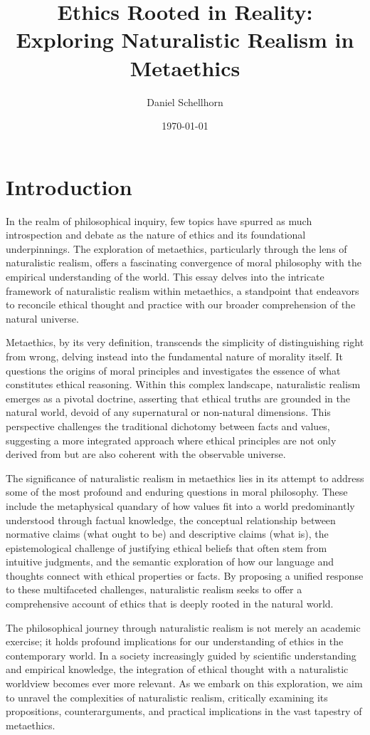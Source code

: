 \documentclass[12pt,a4paper]{article}
\title{Ethics Rooted in Reality: Exploring Naturalistic Realism in Metaethics}
\author{Daniel Schellhorn}
\date{\today}
\begin{document}
\maketitle

\section{Introduction}
In the realm of philosophical inquiry, few topics have spurred as much introspection and debate as the nature of ethics and its foundational underpinnings. The exploration of metaethics, particularly through the lens of naturalistic realism, offers a fascinating convergence of moral philosophy with the empirical understanding of the world. This essay delves into the intricate framework of naturalistic realism within metaethics, a standpoint that endeavors to reconcile ethical thought and practice with our broader comprehension of the natural universe.

Metaethics, by its very definition, transcends the simplicity of distinguishing right from wrong, delving instead into the fundamental nature of morality itself. It questions the origins of moral principles and investigates the essence of what constitutes ethical reasoning. Within this complex landscape, naturalistic realism emerges as a pivotal doctrine, asserting that ethical truths are grounded in the natural world, devoid of any supernatural or non-natural dimensions. This perspective challenges the traditional dichotomy between facts and values, suggesting a more integrated approach where ethical principles are not only derived from but are also coherent with the observable universe.

The significance of naturalistic realism in metaethics lies in its attempt to address some of the most profound and enduring questions in moral philosophy. These include the metaphysical quandary of how values fit into a world predominantly understood through factual knowledge, the conceptual relationship between normative claims (what ought to be) and descriptive claims (what is), the epistemological challenge of justifying ethical beliefs that often stem from intuitive judgments, and the semantic exploration of how our language and thoughts connect with ethical properties or facts. By proposing a unified response to these multifaceted challenges, naturalistic realism seeks to offer a comprehensive account of ethics that is deeply rooted in the natural world.

The philosophical journey through naturalistic realism is not merely an academic exercise; it holds profound implications for our understanding of ethics in the contemporary world. In a society increasingly guided by scientific understanding and empirical knowledge, the integration of ethical thought with a naturalistic worldview becomes ever more relevant. As we embark on this exploration, we aim to unravel the complexities of naturalistic realism, critically examining its propositions, counterarguments, and practical implications in the vast tapestry of metaethics.
\end{document}
